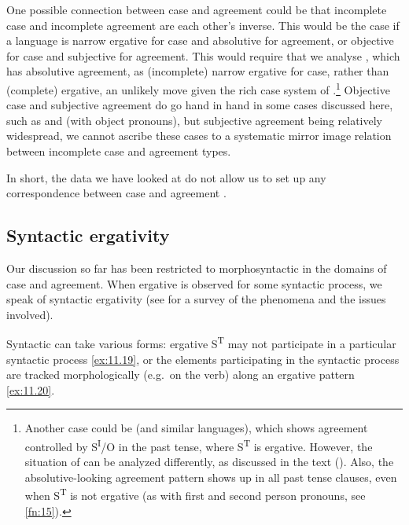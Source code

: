 \documentclass[output=paper]{langsci/langscibook}
\begin{document}
One possible connection between case and agreement  could be
that incomplete case  and incomplete agreement 
are each other’s inverse. This would be the case if a language is narrow
ergative for case and absolutive for agreement, or objective for case and
subjective for agreement.  This would require that we analyse , which
has absolutive agreement, as (incomplete) narrow ergative for case, rather than
(complete) ergative, an unlikely move given the rich case system of 
\citep{Polinsky2014}.\footnote{Another case could be  (and similar
    languages), which shows agreement controlled by S\textsuperscript{I}/O in
    the past tense, where S\textsuperscript{T} is ergative. However, the
    situation of  can be analyzed differently, as discussed in the
    text ().  Also, the absolutive-looking agreement pattern shows up in all past
    tense clauses, even when S\textsuperscript{T} is not ergative (as with
first and second person pronouns, see \cref{fn:15}).} Objective case and
subjective agreement do go hand in hand in some cases discussed here, such as
 and  (with object pronouns), but subjective
agreement being relatively widespread, we cannot ascribe these cases to a
systematic mirror image relation between incomplete case and agreement types.

In short, the data we have looked at do not allow us to set up any
correspondence between case and agreement .

\subsection{Syntactic ergativity}\label{sec:11.5.5}

Our discussion so far has been restricted to morphosyntactic  in
the domains of case and agreement. When ergative  is observed
for some syntactic process, we speak of syntactic ergativity
(see \citealt{Deal2016} for a survey of the phenomena and the issues involved).

Syntactic  can take various forms: ergative S\textsuperscript{T} may
not participate in a particular syntactic process \eqref{ex:11.19}, or the elements
participating in the syntactic process are tracked morphologically (e.g.\ on
the verb) along an ergative  pattern
\eqref{ex:11.20}.
\end{document}
